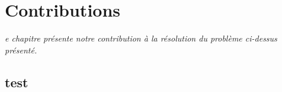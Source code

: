 \let\textcircled=\pgftextcircled
\chapter{Contributions}
\label{chap:contrib}

\textit{e chapitre présente notre contribution à la résolution du problème ci-dessus présenté.}

\minitoc

\newpage  
\section{test}